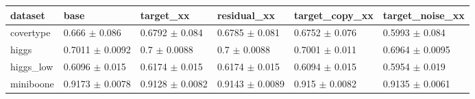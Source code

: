 \begin{tabular}{llllll}
\toprule
dataset & base & target\_xx & residual\_xx & target\_copy\_xx & target\_noise\_xx \\
\midrule
covertype & 0.666 $\pm$ 0.086 & 0.6792 $\pm$ 0.084 & 0.6785 $\pm$ 0.081 & 0.6752 $\pm$ 0.076 & 0.5993 $\pm$ 0.084 \\
higgs & 0.7011 $\pm$ 0.0092 & 0.7 $\pm$ 0.0088 & 0.7 $\pm$ 0.0088 & 0.7001 $\pm$ 0.011 & 0.6964 $\pm$ 0.0095 \\
higgs\_low & 0.6096 $\pm$ 0.015 & 0.6174 $\pm$ 0.015 & 0.6174 $\pm$ 0.015 & 0.6094 $\pm$ 0.015 & 0.5954 $\pm$ 0.019 \\
miniboone & 0.9173 $\pm$ 0.0078 & 0.9128 $\pm$ 0.0082 & 0.9143 $\pm$ 0.0089 & 0.915 $\pm$ 0.0082 & 0.9135 $\pm$ 0.0061 \\
\bottomrule
\end{tabular}
